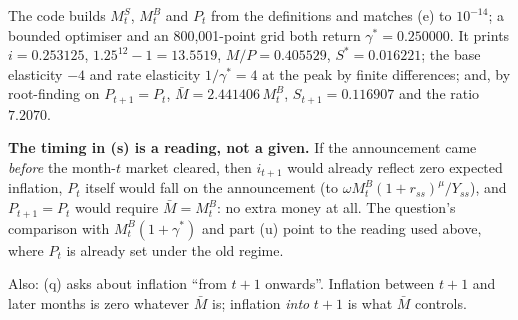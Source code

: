 \documentclass[12pt, letterpaper]{article}
\newcommand{\Ms}{M^{S}}
\newcommand{\MBase}{M^{B}}
\begin{document}
\begin{tcolorbox}[evenbox,title={Problem 11.6 \quad Seignorage with High Inflation}]
\begin{tcolorbox}[databox]
The code builds $\Ms_t$, $\MBase_t$ and $P_t$ from the definitions and matches (e) to
$10^{-14}$; a bounded optimiser and an 800{,}001-point grid both return $\gamma^\ast=0.250000$.
It prints $i=0.253125$, $1.25^{12}-1=13.5519$, $M/P=0.405529$, $S^\ast=0.016221$; the base
elasticity $-4$ and rate elasticity $1/\gamma^\ast=4$ at the peak by finite differences; and, by
root-finding on $P_{t+1}=P_t$, $\bar M=2.441406\,\MBase_t$, $S_{t+1}=0.116907$ and the ratio $7.2070$.
\end{tcolorbox}

\begin{tcolorbox}[trapbox]
\small
\textbf{The timing in (s) is a reading, not a given.} If the announcement came \emph{before}
the month-$t$ market cleared, then $i_{t+1}$ would already reflect zero expected inflation, $P_t$
itself would fall on the announcement (to $\omega\MBase_t(1+r_{ss})^{\mu}/Y_{ss}$), and
$P_{t+1}=P_t$ would require $\bar M=\MBase_t$: no extra money at all. The question's comparison with
$\MBase_t(1+\gamma^\ast)$ and part (u) point to the reading used above, where $P_t$ is already set
under the old regime.

\smallskip
Also: (q) asks about inflation ``from $t+1$ onwards''. Inflation between $t+1$ and later months is
zero whatever $\bar M$ is; inflation \emph{into} $t+1$ is what $\bar M$ controls.
\end{tcolorbox}
\end{tcolorbox}
\end{document}
